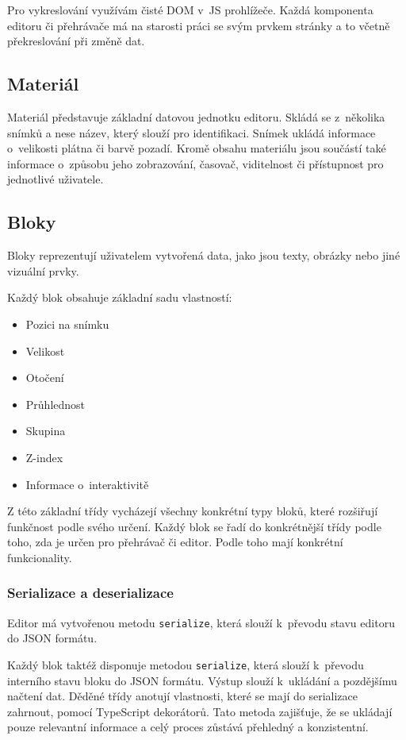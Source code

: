 Pro vykreslování využívám čisté DOM v~JS prohlížeče.
Každá komponenta editoru či přehrávače má na starosti práci se svým prvkem stránky a to včetně překreslování při změně dat.

\subsection{Materiál}

Materiál představuje základní datovou jednotku editoru.
Skládá se z~několika snímků a nese název, který slouží pro identifikaci. 
Snímek ukládá informace o~velikosti plátna či barvě pozadí.
Kromě obsahu materiálu jsou součástí také informace o~způsobu jeho zobrazování, časovač, viditelnost či přístupnost pro jednotlivé uživatele.

\subsection{Bloky}

Bloky reprezentují uživatelem vytvořená data, jako jsou texty, obrázky nebo jiné vizuální prvky. 

Každý blok obsahuje základní sadu vlastností: 

\begin{itemize}
	\item Pozici na snímku
	\item Velikost
	\item Otočení
	\item Průhlednost
	\item Skupina
	\item Z-index
	\item Informace o~interaktivitě
\end{itemize}

Z této základní třídy vycházejí všechny konkrétní typy bloků, které rozšiřují funkčnost podle svého určení.
Každý blok se řadí do konkrétnější třídy podle toho, zda je určen pro přehrávač či editor.
Podle toho mají konkrétní funkcionality.

\subsubsection{Serializace a deserializace}

Editor má vytvořenou metodu \texttt{serialize}, která slouží k~převodu stavu editoru do JSON formátu.

Každý blok taktéž disponuje metodou \texttt{serialize}, která slouží k~převodu interního stavu bloku do JSON formátu. 
Výstup slouží k~ukládání a pozdějšímu načtení dat. 
Děděné třídy anotují vlastnosti, které se mají do serializace zahrnout, pomocí TypeScript dekorátorů. 
Tato metoda zajišťuje, že se ukládají pouze relevantní informace a celý proces zůstává přehledný a konzistentní.


